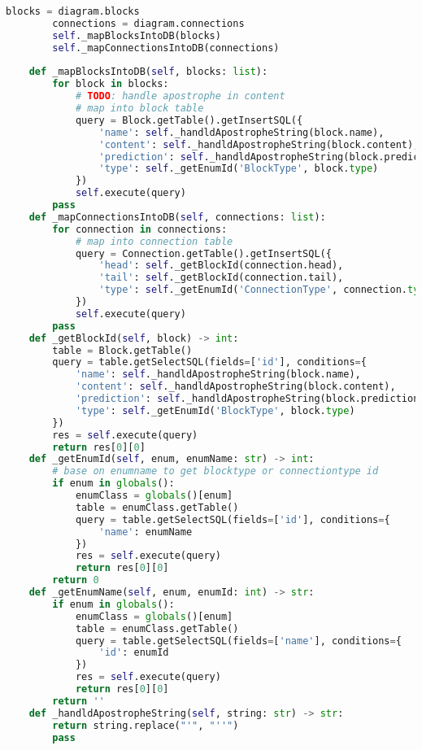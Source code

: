 \begin{lstlisting}[language=Python, caption={$\texttt{DBMS}$ class.}, label={lst:21}]
        blocks = diagram.blocks
        connections = diagram.connections
        self._mapBlocksIntoDB(blocks)
        self._mapConnectionsIntoDB(connections)
        
    def _mapBlocksIntoDB(self, blocks: list):
        for block in blocks:
            # TODO: handle apostrophe in content
            # map into block table
            query = Block.getTable().getInsertSQL({
                'name': self._handldApostropheString(block.name),
                'content': self._handldApostropheString(block.content),
                'prediction': self._handldApostropheString(block.prediction),
                'type': self._getEnumId('BlockType', block.type)
            })
            self.execute(query)
        pass
    def _mapConnectionsIntoDB(self, connections: list):
        for connection in connections:
            # map into connection table
            query = Connection.getTable().getInsertSQL({
                'head': self._getBlockId(connection.head),
                'tail': self._getBlockId(connection.tail),
                'type': self._getEnumId('ConnectionType', connection.type)
            })
            self.execute(query)
        pass
    def _getBlockId(self, block) -> int:
        table = Block.getTable()
        query = table.getSelectSQL(fields=['id'], conditions={
            'name': self._handldApostropheString(block.name),
            'content': self._handldApostropheString(block.content),
            'prediction': self._handldApostropheString(block.prediction),
            'type': self._getEnumId('BlockType', block.type)
        })
        res = self.execute(query)
        return res[0][0]
    def _getEnumId(self, enum, enumName: str) -> int:
        # base on enumname to get blocktype or connectiontype id
        if enum in globals():
            enumClass = globals()[enum]
            table = enumClass.getTable()
            query = table.getSelectSQL(fields=['id'], conditions={
                'name': enumName
            })
            res = self.execute(query)
            return res[0][0]
        return 0
    def _getEnumName(self, enum, enumId: int) -> str:
        if enum in globals():
            enumClass = globals()[enum]
            table = enumClass.getTable()
            query = table.getSelectSQL(fields=['name'], conditions={
                'id': enumId
            })
            res = self.execute(query)
            return res[0][0]
        return ''
    def _handldApostropheString(self, string: str) -> str:
        return string.replace("'", "''")
        pass
\end{lstlisting}